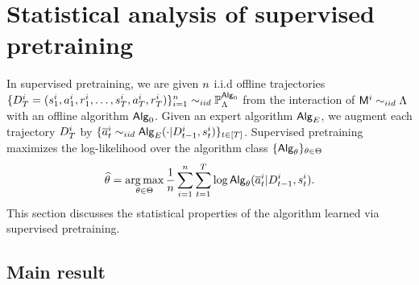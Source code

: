\section{Statistical analysis of supervised pretraining}\label{sec:supervised-pretraining}

In supervised pretraining, we are given ${n}$ i.i.d offline trajectories $\{{D}^{i}_{T} =  ({s}^{i}_1,{a}^{i}_1, {r}^{i}_1, \ldots, {s}^{i}_{T}, \allowbreak {a}^{i}_{T}, \allowbreak{r}^{i}_{T}) \}_{i=1}^{n} \sim_{iid} \mathbb{P}_{\Lambda}^{{\mathsf{Alg}}_0}$ from the interaction of ${\mathsf{M}}^{i} \sim_{iid} {\Lambda}$ with an offline algorithm ${\mathsf{Alg}}_0$. Given an expert algorithm ${\mathsf{Alg}}_{{E}}$, we augment each trajectory ${D}_{{T}}^i$ by $\{ {\overline{a}}_t^i \sim_{iid} {\mathsf{Alg}}_{{E}}( \cdot |{D}_{t-1}^i, {s}_t^i)\}_{t \in [{T}]}$. Supervised pretraining maximizes the log-likelihood over the algorithm class $\{ {\mathsf{Alg}}_{\theta}\}_{{\theta}\in{\Theta}}$
\begin{align}
{\widehat{\theta}}=\operatorname*{arg\,max}_{{\theta}\in{\Theta}}  \frac{1}{{n}}\sum_{i=1}^{n}\sum_{t=1}^{T}\log {\mathsf{Alg}}_{\theta}({\overline{a}}^{i}_{t}|{D}_{t-1}^{i},{s}^{i}_t). \label{eq:general_mle}
\end{align}
This section discusses the statistical properties of the algorithm learned via supervised pretraining. 




\subsection{Main result}

